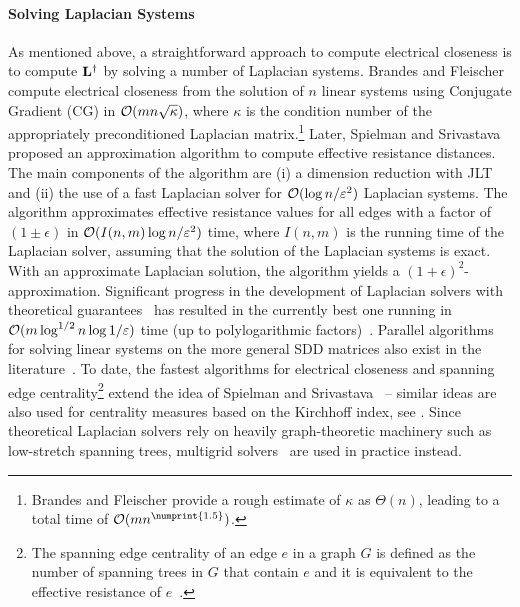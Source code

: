 \paragraph{Solving Laplacian Systems}
As mentioned above, a straightforward approach to compute electrical closeness
is to compute $\mathbf{L}^\dagger$ by solving a number of Laplacian systems.
Brandes and Fleischer~\cite{DBLP:conf/stacs/BrandesF05} compute electrical closeness
from the solution of $n$ linear systems using Conjugate Gradient (CG) in $\mathcal{O}(mn\sqrt{\kappa})$,
where $\kappa$ is the condition number of the appropriately preconditioned Laplacian
matrix.\footnote{Brandes and Fleischer provide a rough estimate of $\kappa$
as $\Theta(n)$, leading to a total time of $\Oh(mn^{\numprint{1.5}})$.}
%
Later, Spielman and Srivastava~\cite{DBLP:journals/siamcomp/SpielmanS11}
proposed an approximation algorithm to compute effective resistance distances.
The main components of the algorithm are (i) a dimension reduction with
JLT~\cite{johnson1984extensions} and (ii) the use of a fast
Laplacian solver for $\mathcal{O}(\log n/\varepsilon^2)$ Laplacian systems. The algorithm
approximates effective resistance values for all edges with a factor of $(1 \pm
\epsilon)$ in $\mathcal{O}(I(n, m)\log n/\varepsilon^2)$ time, where $I(n, m)$ is the
running time of the Laplacian solver, assuming that the solution of the
Laplacian systems is exact. With an approximate Laplacian solution, the algorithm
yields a $(1 + \epsilon)^2$-approximation. Significant progress in the development
of Laplacian solvers with theoretical guarantees~\cite{DBLP:conf/stoc/CohenKMPPRX14,
DBLP:conf/stoc/KelnerOSZ13,DBLP:conf/focs/KoutisMP11,DBLP:journals/siamcomp/KoutisMP14,
DBLP:conf/stoc/KyngLPSS16}
has resulted in the currently best one running in $\mathcal{O}(m\log^{1/2}n \log
1/\varepsilon)$ time (up to polylogarithmic
factors)~\cite{DBLP:conf/stoc/CohenKMPPRX14}.
%
Parallel algorithms for solving linear systems on the more general SDD matrices
also exist in the
literature~\cite{DBLP:conf/spaa/BlellochGKMPT11,DBLP:conf/stoc/PengS14}. To
date, the fastest algorithms for electrical closeness and spanning edge
centrality\footnote{The spanning edge centrality of an edge $e$ in a graph $G$
is defined as the number of spanning trees in $G$ that contain $e$ and it
is equivalent to the effective resistance of
$e$~\cite{DBLP:conf/www/MavroforakisGKT15}.}
extend the idea of Spielman and
Srivastava~\cite{DBLP:conf/siamcsc/BergaminiWLM16,
DBLP:conf/ijcai/HayashiAY16,DBLP:conf/www/MavroforakisGKT15}
-- similar ideas are also used for centrality measures based on the Kirchhoff
index, see . Since theoretical Laplacian
solvers rely on heavily graph-theoretic machinery such as low-stretch spanning
trees, multigrid
solvers~\cite{DBLP:conf/siamcsc/BergaminiWLM16,
DBLP:conf/isvc/KoutisMT09,DBLP:journals/siamsc/LivneB12}
are used in practice instead.

